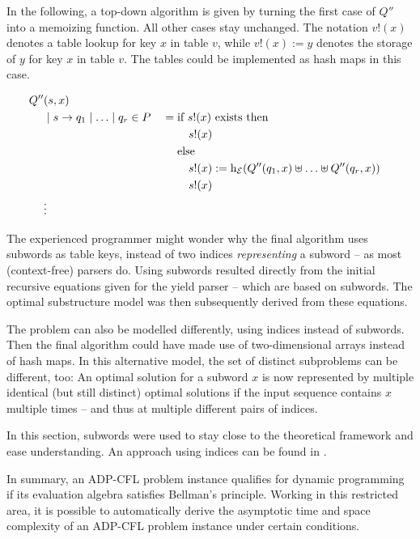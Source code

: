 \documentclass[
    a4paper,
    12pt,
    twoside,
    BCOR=12mm,
    parskip=half,
    chapterprefix,
    numbers=noenddot,
    bibliography=totoc
]{scrbook}
\begin{document}
In the following, a top-down algorithm is given by turning the first case of $Q''$ into a memoizing function. All other cases stay unchanged. The notation $v!(x)$ denotes a table lookup for key $x$ in table $v$, while $v!(x):=y$ denotes the storage of $y$ for key $x$ in table $v$. The tables could be implemented as hash maps in this case.

\pagebreak

\begin{align}
	Q''&(s,x) \label{eq:memoizing_adpcfl}\\
	&\mid s \to q_1 \mid \ldots \mid q_r \in P &&= \begin{aligned}[t]
			&\text{if } s!(x) \text{ exists then }\\
			&\quad s!(x)\\
			&\text{else}\\
			&\quad s!(x) := \mathrm{h}_\mathcal{E}(Q''(q_1,x) \uplus \ldots \uplus Q''(q_r,x))\\
			&\quad s!(x)
		\end{aligned} \nonumber \\
	&\vdots \nonumber
\end{align}

\begin{remark}
	The experienced programmer might wonder why the final algorithm uses subwords as table keys, instead of two indices \emph{representing} a subword -- as most (context-free) parsers do. Using subwords resulted directly from the initial recursive equations given for the yield parser -- which are based on subwords. The optimal substructure model was then subsequently derived from these equations.
	
	The problem can also be modelled differently, using indices instead of subwords. Then the final algorithm could have made use of two-dimensional arrays instead of hash maps. In this alternative model, the set of distinct subproblems can be different, too: An optimal solution for a subword $x$ is now represented by multiple identical (but still distinct) optimal solutions if the input sequence contains $x$ multiple times -- and thus at multiple different pairs of indices.
	
	In this section, subwords were used to stay close to the theoretical framework and ease understanding. An approach using indices can be found in \citet{giegerich_implementing_2002}.
\end{remark}

In summary, an ADP-CFL problem instance qualifies for dynamic programming if its evaluation algebra satisfies Bellman's principle. Working in this restricted area, it is possible to automatically derive the asymptotic time and space complexity of an ADP-CFL problem instance under certain conditions.
\end{document}
